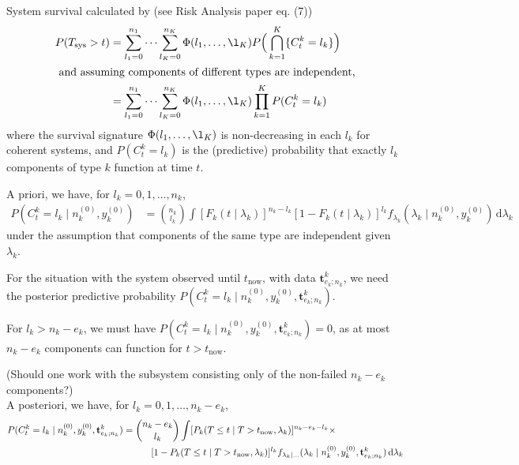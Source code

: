 \documentclass[12pt,a4paper,fleqn]{narms}
\newcommand{\dd}{\,\mathrm{d}}
\newcommand{\mbf}[1]{\mathbf{#1}}
\newcommand{\uz}{^{(0)}} %
\def\Tsys{T_\text{sys}}
\def\ykz{y\uz_k}
\def\nkz{n\uz_k}
\def\tnow{t_\text{now}}
\begin{document}
\newpage

System survival calculated by (see Risk Analysis paper eq. (7))
\begin{align}
P(\Tsys > t) &= \sum_{l_1=0}^{n_1} \cdots \sum_{l_K=0}^{n_K} \Phi(l_1,\ldots,\l_K) P\Big( \bigcap_{k=1}^K \{ C^k_t = l_k\} \Big) \\
\intertext{ and assuming components of different types are independent,}
             &= \sum_{l_1=0}^{n_1} \cdots \sum_{l_K=0}^{n_K} \Phi(l_1,\ldots,\l_K) \prod_{k=1}^K P(C^k_t = l_k)
\end{align}
where the survival signature $\Phi(l_1,\ldots,\l_K)$ is non-decreasing in each $l_k$ for coherent systems,
and $P(C^k_t = l_k)$ is the (predictive) probability that exactly $l_k$ components of type $k$ function at time $t$.

A priori, we have, for $l_k = 0,1,\ldots, n_k$,
\begin{align}
P(C^k_t = l_k\mid\nkz,\ykz)
 &= { n_k \choose l_k} \int [F_k(t \mid\lambda_k)]^{n_k-l_k}
                        [1 - F_k(t \mid\lambda_k)]^{l_k} f_{\lambda_k}(\lambda_k\mid\nkz,\ykz) \dd \lambda_k
\end{align}
under the assumption that components of the same type are independent given $\lambda_k$.

\bigskip

For the situation with the system observed until $\tnow$, with data $\mbf{t}^k_{e_k;n_k}$,
we need the posterior predictive probability $P(C^k_t = l_k\mid\nkz,\ykz, \mbf{t}^k_{e_k;n_k})$.

For $l_k > n_k - e_k$, we must have $P(C^k_t = l_k\mid\nkz,\ykz, \mbf{t}^k_{e_k;n_k}) = 0$,
as at most $n_k - e_k$ components can function for $t > \tnow$.

(Should one work with the subsystem consisting only of the non-failed $n_k - e_k$ components?)\\

A posteriori, we have, for $l_k = 0,1,\ldots, n_k - e_k$,
\begin{align}
P(C^k_t = l_k\mid\nkz,\ykz, \mbf{t}^k_{e_k;n_k})
 &= { n_k - e_k \choose l_k} \int [P_k(T \leq t \mid T > \tnow, \lambda_k)]^{n_k - e_k - l_k} \times \\ & \hspace*{7ex}
                              [1 - P_k(T \leq t \mid T > \tnow, \lambda_k)]^{l_k}
    f_{\lambda_k\mid\ldots}(\lambda_k\mid\nkz,\ykz,\mbf{t}^k_{e_k;n_k}) \dd \lambda_k
\end{align}
\end{document}
